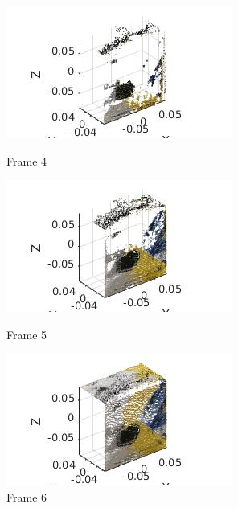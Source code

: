 \documentclass[10pt,a4paper]{article}
\begin{document}
\begin{figure}[!h]
	\begin{minipage}[t]{0.33 \linewidth}
		
		\centering
		\includegraphics[scale=0.5]{box/4.jpg}
		\caption{ \small Frame 4}
	\end{minipage}
	\begin{minipage}[t]{0.33 \linewidth}
		\centering
		\includegraphics[scale=0.5]{box/5.jpg}
		\caption{ \small Frame 5}
	\end{minipage}
	\begin{minipage}[t]{0.33 \linewidth}
		\centering
		\includegraphics[scale=0.5]{box/6.jpg}
		\caption{ \small Frame 6}
	\end{minipage}
\end{figure}
\end{document}
